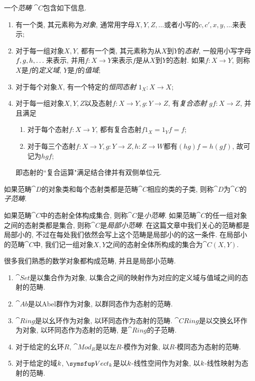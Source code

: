 一个\emph{范畴} $\cat{C}$包含如下信息.
\begin{enumerate}
  \item 有一个类, 其元素称为\emph{对象}, 通常用字母$X, Y, Z, \dotsc$或者小写的$c, c', x, y, \dotsc$来表示;
  \item 对于每一组对象$X, Y$, 都有一个类, 其元素称为从$X$到$Y$的\emph{态射}, 一般用小写字母$f, g, h,\linebreak[0] \dotsc$来表示, 并用$f\colon X\to Y$来表示$f$是从$X$到$Y$的态射. 如果$f\colon X\to Y$, 则称$X$是$f$的\emph{定义域}, $Y$是$f$的\emph{值域};
  \item 对于每个对象$X$, 有一个特定的\emph{恒同态射} $1_X\colon X\to X$;
  \item 对于每一组对象$X, Y, Z$以及态射$f\colon X\to Y, g\colon Y\to Z$, 有\emph{复合态射} $gf\colon X\to Z$, 并且满足
  \begin{enumerate}
    \item 对于每个态射$f\colon X\to Y$, 都有复合态射$f1_{X}=1_{Y}f=f$;
    \item 对于每三个态射$f\colon X\to Y, g\colon Y\to Z, h\colon Z\to W$都有$(hg)f=h(gf)$, 故可记为$hgf$;
  \end{enumerate}
  即态射的``复合运算"满足结合律并有双侧单位元.
\end{enumerate}

如果范畴$\cat{D} $的对象类和每个态射类都是范畴$\cat{C}$相应的类的子类, 则称$\cat{D}$为$\cat{C}$的\emph{子范畴}.

如果范畴$\cat{C}$中的态射全体构成集合, 则称$\cat{C}$是\emph{小范畴}. 如果范畴$\cat{C}$的任一组对象之间的态射类都是集合, 则称$\cat{C}$是\emph{局部小范畴}. 在这篇文章中我们关心的范畴都是局部小的, 不过在每处我们依然会写上这个范畴是局部小的的这一条件. 在局部小的范畴$\cat{C}$中, 我们记一组对象$X, Y$之间的态射全体所构成的集合为$\cat{C} (X, Y)$.

\begin{example}
  很多我们熟悉的数学对象都构成范畴, 并且是局部小范畴.
  \begin{enumerate}\label{exm:concretecategory}
    \item $\cat{Set}$是以集合作为对象, 以集合之间的映射作为对应的定义域与值域之间的态射的范畴.
    \item $\cat{Ab}$是以Abel群作为对象, 以群同态作为态射的范畴.
    \item $\cat{Ring}$是以幺环作为对象, 以环同态作为态射的范畴. $\cat{CRing}$是以交换幺环作为对象, 以环同态作为态射的范畴, 是$\cat{Ring}$的子范畴.
    \item 对于给定的幺环$R$, $\cat{Mod}_R$是以左$R$-模作为对象, 以$R$-模同态为态射的范畴.
    \item 对于给定的域$k$, $\cat{Vect}_{\kk}$是以$k$-线性空间作为对象, 以$k$-线性映射为态射的范畴.
  \end{enumerate}
\end{example}

